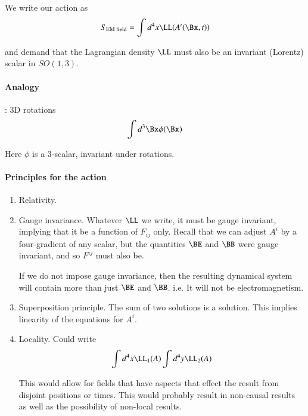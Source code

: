 We write our action as
%
\begin{equation}\label{eqn:relativisticElectrodynamicsL12b:170}
S_{\text{EM field}} = \int d^4 x \LL(A^i(\Bx, t))
\end{equation}

and demand that the Lagrangian density \(\LL\) must also be an invariant (Lorentz) scalar in \(SO(1,3)\).

\paragraph{Analogy}: 3D rotations
%
\begin{equation}\label{eqn:relativisticElectrodynamicsL12b:190}
\int d^3 \Bx \phi(\Bx)
\end{equation}

Here \(\phi\) is a 3-scalar, invariant under rotations.

\paragraph{Principles for the action}

\begin{enumerate}
\item Relativity.
\item Gauge invariance.  Whatever \(\LL\) we write, it must be gauge invariant, implying that it be a function of \(F_{ij}\) only.  Recall that we can adjust \(A^i\) by a four-gradient of any scalar, but the quantities \(\BE\) and \(\BB\) were gauge invariant, and so \(F^{ij}\) must also be.

If we do not impose gauge invariance, then the resulting dynamical system will contain more than just \(\BE\) and \(\BB\).  i.e. It will not be electromagnetism.

\item Superposition principle.  The sum of two solutions is a solution.  This implies linearity of the equations for \(A^i\).

\item Locality.  Could write
%
\begin{equation}\label{eqn:relativisticElectrodynamicsL12b:210}
\int d^4 x \LL_1(A) \int d^4 y \LL_2(A)
\end{equation}

This would allow for fields that have aspects that effect the result from disjoint positions or times.  This would probably result in non-causal results as well as the possibility of non-local results.
\end{enumerate}

